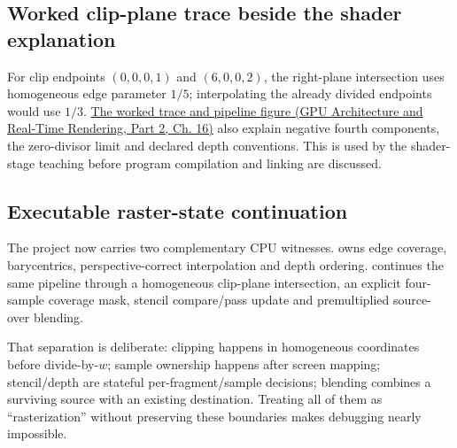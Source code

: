 \subsection{Worked clip-plane trace beside the shader explanation}\label{appendix-40426e4b2103-worked-clip-plane-trace-beside-the-shader-explanation}

\hypertarget{appendix-40426e4b2103-worked-clip-plane-trace-beside-the-shader-explanation}{}

For clip endpoints \((0,0,0,1)\) and \((6,0,0,2)\), the right-plane intersection uses homogeneous edge parameter \(1/5\); interpolating the already divided endpoints would use \(1/3\). \href{../06-GPU-Architecture-and-Real-Time-Rendering-P02/main.pdf\#06-engine-ii-ch025-clip-coordinates-are-not-normalized-device-coordinates}{The worked trace and pipeline figure (GPU Architecture and Real-Time Rendering, Part 2, Ch. 16)} also explain negative fourth components, the zero-divisor limit and declared depth conventions. This is used by the shader-stage teaching before program compilation and linking are discussed.

\subsection{Executable raster-state continuation}\label{appendix-40426e4b2103-executable-raster-state-continuation}

\hypertarget{appendix-40426e4b2103-executable-raster-state-continuation}{}

The project now carries two complementary CPU witnesses.  owns edge coverage, barycentrics, perspective-correct interpolation and depth ordering.  continues the same pipeline through a homogeneous clip-plane intersection, an explicit four-sample coverage mask, stencil compare/pass update and premultiplied source-over blending.

That separation is deliberate: clipping happens in homogeneous coordinates before divide-by-\(w\); sample ownership happens after screen mapping; stencil/depth are stateful per-fragment/sample decisions; blending combines a surviving source with an existing destination. Treating all of them as ``rasterization'' without preserving these boundaries makes debugging nearly impossible.
